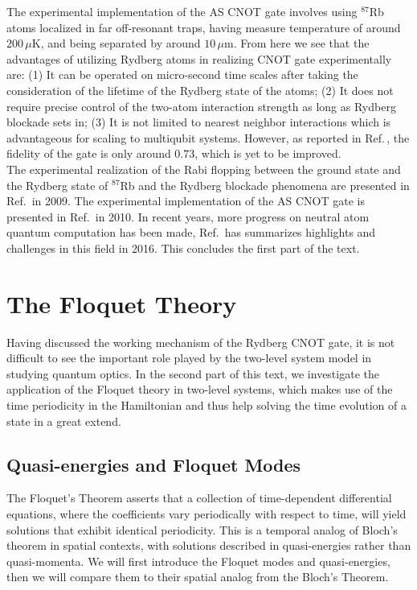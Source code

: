 \documentclass[reprint, amsmath, amssymb, aps]{revtex4-2}
\begin{document}
The experimental implementation of the AS CNOT gate involves using $^{87}$Rb atoms localized in far off-resonant traps, having measure temperature of around $200\,\mu$K, and being separated by around $10\,\mu$m. From here we see that the advantages of utilizing Rydberg atoms in realizing CNOT gate experimentally are: (1) It can be operated on micro-second time scales after taking the consideration of the lifetime of the Rydberg state of the atoms; (2) It does not require precise control of the two-atom interaction strength as long as Rydberg blockade sets in; (3) It is not limited to nearest neighbor interactions which is advantageous for scaling to multiqubit systems. However, as reported in Ref.\,\cite{Isenhower}, the fidelity of the gate is only around $0.73$, which is yet to be improved.\\

The experimental realization of the Rabi flopping between the ground state and the Rydberg state of $^{87}$Rb and the Rydberg blockade phenomena are presented in Ref.\,\cite{Urban} in 2009. The experimental implementation of the AS CNOT gate is presented in Ref.\,\cite{Isenhower} in 2010. In recent years, more progress on neutral atom quantum computation has been made, Ref.\,\cite{Saffman} has summarizes highlights and challenges in this field in 2016. This concludes the first part of the text. 


\section{\label{sec:level1}The Floquet Theory}
Having discussed the working mechanism of the Rydberg CNOT gate, it is not difficult to see the important role played by the two-level system model in studying quantum optics. In the second part of this text, we investigate the application of the Floquet theory in two-level systems, which makes use of the time periodicity in the Hamiltonian and thus help solving the time evolution of a state in a great extend. 


\subsection{Quasi-energies and Floquet Modes}
The Floquet's Theorem asserts that a collection of time-dependent differential equations, where the coefficients vary periodically with respect to time, will yield solutions that exhibit identical periodicity. This is a temporal analog of Bloch's theorem in spatial contexts, with solutions described in quasi-energies rather than quasi-momenta. We will first introduce the Floquet modes and quasi-energies, then we will compare them to their spatial analog from the Bloch's Theorem.\\
\end{document}
